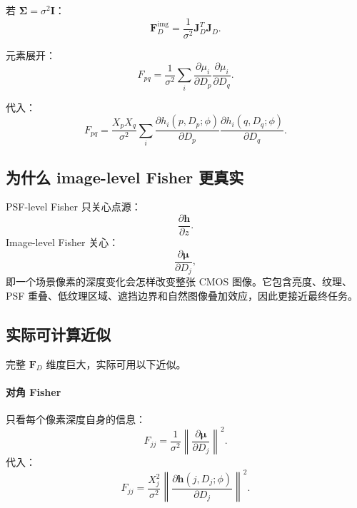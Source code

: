 \documentclass[11pt,a4paper,fontset=none]{ctexart}
\begin{document}
若 $\bm\Sigma=\sigma^2\bm I$：
\begin{equation}
\boxed{
  \bm F_D^{\mathrm{img}}
  =
  \frac{1}{\sigma^2}
  \bm J_D^T\bm J_D.
}
\end{equation}

元素展开：
\begin{equation}
  F_{pq}
  =
  \frac{1}{\sigma^2}
  \sum_i
  \frac{\partial\mu_i}{\partial D_p}
  \frac{\partial\mu_i}{\partial D_q}.
\end{equation}

代入：
\begin{equation}
\boxed{
  F_{pq}
  =
  \frac{X_pX_q}{\sigma^2}
  \sum_i
  \frac{\partial h_i(p,D_p;\phi)}{\partial D_p}
  \frac{\partial h_i(q,D_q;\phi)}{\partial D_q}.
}
\end{equation}

\subsection{为什么 image-level Fisher 更真实}

PSF-level Fisher 只关心点源：
\begin{equation}
  \frac{\partial\bm h}{\partial z}.
\end{equation}
Image-level Fisher 关心：
\begin{equation}
  \frac{\partial\bm\mu}{\partial D_j},
\end{equation}
即一个场景像素的深度变化会怎样改变整张 CMOS 图像。它包含亮度、纹理、PSF 重叠、低纹理区域、遮挡边界和自然图像叠加效应，因此更接近最终任务。

\subsection{实际可计算近似}

完整 $\bm F_D$ 维度巨大，实际可用以下近似。

\paragraph{对角 Fisher}
只看每个像素深度自身的信息：
\begin{equation}
  F_{jj}
  =
  \frac{1}{\sigma^2}
  \left\|
  \frac{\partial\bm\mu}{\partial D_j}
  \right\|^2.
\end{equation}
代入：
\begin{equation}
  F_{jj}
  =
  \frac{X_j^2}{\sigma^2}
  \left\|
  \frac{\partial\bm h(j,D_j;\phi)}{\partial D_j}
  \right\|^2.
\end{equation}
\end{document}
